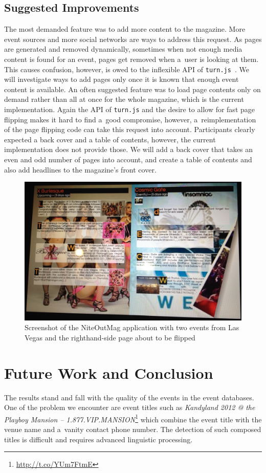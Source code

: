 \documentclass[runningheads,a4paper]{llncs}
\begin{document}
{\subsection{Suggested Improvements}
The most demanded feature was to add more content to the magazine.
More event sources and more social networks are ways to address this request.
As pages are generated and removed dynamically,
sometimes when not enough media content is found for an event,
pages get removed when a~user is looking at them.
This causes confusion, however, is owed to the inflexible API of \texttt{turn.js}~\cite{TurnJs2012}.
We will investigate ways to add pages
only once it is known that enough event content is available.
An often suggested feature was to load page contents only on demand
rather than all at once for the whole magazine,
which is the current implementation.
Again the API of \texttt{turn.js}
and the desire to allow for fast page flipping makes it hard to find a~good compromise,
however, a~reimplementation of the page flipping code can take this request into account.
Participants clearly expected a back cover and a table of contents, however,
the current implementation does not provide those.
We will add a back cover that takes an even and odd number of pages into account,
and create a table of contents and also add headlines to the magazine's front cover.

\begin{figure}[b!]
\centering
\includegraphics[width=0.8\columnwidth]{./screenshot.jpg}
\caption{Screenshot of the NiteOutMag application with two events from Las Vegas and the righthand-side page about to be flipped}
\label{fig:screenshot}
\end{figure}

\section{Future Work and Conclusion} \label{sec:conclusion}
The results stand and fall with the quality of the events in the event databases. One of the problem we encounter are event titles such as
\emph{Kandyland 2012 @ the Playboy Mansion -- 1.877.VIP.MANSION}\footnote{\url{http://t.co/YUm7FtmE}} which combine the event title with the venue name
and a~vanity contact phone number. The detection of such composed titles is difficult and requires advanced linguistic processing.

}
\end{document}
